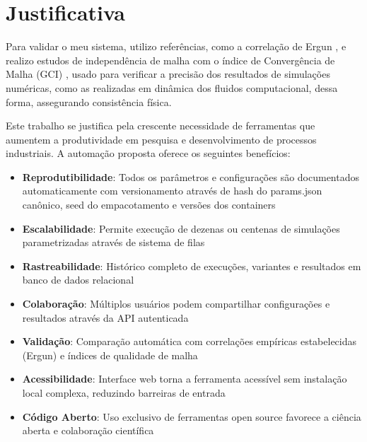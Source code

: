 \section{Justificativa}

Para validar o meu sistema, utilizo referências, como a correlação de Ergun \cite{ergun1952}, e realizo estudos de independência de malha com o índice de Convergência de Malha (GCI) \cite{roache1994}, usado para verificar a precisão dos resultados de simulações numéricas, como as realizadas em dinâmica dos fluidos computacional, dessa forma, assegurando consistência física.

Este trabalho se justifica pela crescente necessidade de ferramentas que aumentem a produtividade em pesquisa e desenvolvimento de processos industriais. A automação proposta oferece os seguintes benefícios:

\begin{itemize}
    \item \textbf{Reprodutibilidade}: Todos os parâmetros e configurações são documentados automaticamente com versionamento através de hash do params.json canônico, seed do empacotamento e versões dos containers
    
    \item \textbf{Escalabilidade}: Permite execução de dezenas ou centenas de simulações parametrizadas através de sistema de filas
    
    \item \textbf{Rastreabilidade}: Histórico completo de execuções, variantes e resultados em banco de dados relacional
    
    \item \textbf{Colaboração}: Múltiplos usuários podem compartilhar configurações e resultados através da API autenticada
    
    \item \textbf{Validação}: Comparação automática com correlações empíricas estabelecidas (Ergun) e índices de qualidade de malha
    
    \item \textbf{Acessibilidade}: Interface web torna a ferramenta acessível sem instalação local complexa, reduzindo barreiras de entrada
    
    \item \textbf{Código Aberto}: Uso exclusivo de ferramentas open source favorece a ciência aberta e colaboração científica
\end{itemize}

